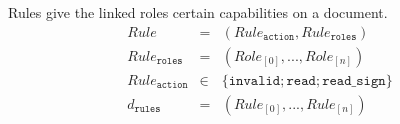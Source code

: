 \begin{comment}
There are multiple ways a user, $u$ can be added to a $Role$. A collaborator can be directly added to the list or collaborators (\ref{eqn:user_in_role}). By proving ownership of an NFT that is part of the role (\ref{eqn:nft_in_role}) or by providing an access token that allows the user to assume the role. The latter two are included here for completeness but will be introduced in a later section. %

\begin{eqnarray}
    u & \in & Role_{\mathtt{members}} \label{eqn:user_in_role} \\  
    NFT & \in & Role_{\mathtt{nfts}} \label{eqn:nft_in_role} \\
    t_{role} & = & Role_{id}
\end{eqnarray}
\end{comment}

Rules give the linked roles certain capabilities on a document.  
\begin{eqnarray}
Rule & = & (Rule_{\mathtt{action}}, Rule_{\mathtt{roles}})\\
 Rule_{\mathtt{roles}} & = & (Role_{[0]}, ..., Role_{[n]}) \\
 Rule_{\mathtt{action}} & \in & \{\mathtt{invalid; read; read\_sign}\} \\
 d_\mathtt{rules} & = & (Rule_{[0]}, ..., Rule_{[n]})
\end{eqnarray}


